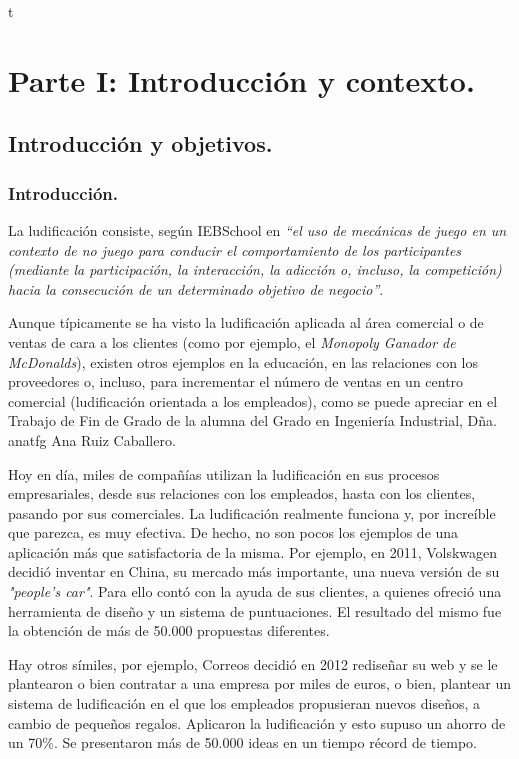 \documentclass[twoside]{report}
\begin{document}
\tableofcontents

\listoffigures
 
\listoftables

\clearpage
{}
t\chapter{Parte I: Introducción y contexto.}
\section{Introducción y objetivos.}

\subsection{Introducción.}

La ludificación consiste, según IEBSchool \cite{iebschoolGami} en \textit{“el uso de mecánicas de juego en un contexto de no juego para conducir el comportamiento de los participantes (mediante la participación, la interacción, la adicción o, incluso, la competición) hacia la consecución de un determinado objetivo de negocio”}. 

Aunque típicamente se ha visto la ludificación aplicada al área comercial o de ventas de cara a los clientes (como por ejemplo, el \cite{monopolymcdo} \textit{Monopoly Ganador de McDonalds}), existen otros ejemplos en la educación, en las relaciones con los proveedores o, incluso, para incrementar el número de ventas en un centro comercial (ludificación orientada a los empleados), como se puede apreciar en el Trabajo de Fin de Grado de la alumna del Grado en Ingeniería Industrial, Dña. {anatfg} Ana Ruiz Caballero.

Hoy en día, miles de compañías utilizan la ludificación en sus procesos empresariales, desde sus relaciones con los empleados, hasta con los clientes, pasando por sus comerciales. La ludificación realmente funciona y, por increíble que parezca, es muy efectiva. De hecho, no son pocos los ejemplos de una aplicación más que satisfactoria de la misma. Por ejemplo, en 2011, \cite{accentureGami} Volskwagen decidió inventar en China, su mercado más importante, una nueva versión de su \textit{"people’s car"}. Para ello contó con la ayuda de sus clientes, a quienes ofreció una herramienta de diseño y un sistema de puntuaciones. El resultado del mismo fue la obtención de más de 50.000 propuestas diferentes.

Hay otros símiles, por ejemplo, Correos decidió en 2012 rediseñar su web y se le plantearon o bien contratar a una empresa por miles de euros, o bien, plantear un sistema de ludificación en el que los empleados propusieran nuevos diseños, a cambio de pequeños regalos. Aplicaron la ludificación y esto supuso un ahorro de un 70\%. Se presentaron más de 50.000 ideas en un tiempo récord de tiempo.
\end{document}

